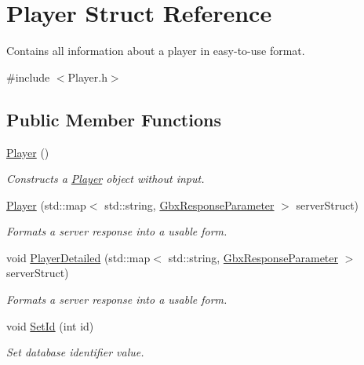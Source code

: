 \hypertarget{structPlayer}{\section{Player Struct Reference}
\label{structPlayer}
}


Contains all information about a player in easy-\/to-\/use format.  




{\ttfamily \#include $<$Player.\-h$>$}

\subsection*{Public Member Functions}
\begin{DoxyCompactItemize}
\item 
\hypertarget{structPlayer_affe0cc3cb714f6deb4e62f0c0d3f1fd8}{\hyperlink{structPlayer_affe0cc3cb714f6deb4e62f0c0d3f1fd8}{Player} ()}\label{structPlayer_affe0cc3cb714f6deb4e62f0c0d3f1fd8}

\begin{DoxyCompactList}\small\item\em Constructs a \hyperlink{structPlayer}{Player} object without input. \end{DoxyCompactList}\item 
\hyperlink{structPlayer_adf15eb006b535a4e1b72b419021f1f11}{Player} (std\-::map$<$ std\-::string, \hyperlink{classGbxResponseParameter}{Gbx\-Response\-Parameter} $>$ server\-Struct)
\begin{DoxyCompactList}\small\item\em Formats a server response into a usable form. \end{DoxyCompactList}\item 
void \hyperlink{structPlayer_a4e7c4a5bfc6fe42e23069a79f495b461}{Player\-Detailed} (std\-::map$<$ std\-::string, \hyperlink{classGbxResponseParameter}{Gbx\-Response\-Parameter} $>$ server\-Struct)
\begin{DoxyCompactList}\small\item\em Formats a server response into a usable form. \end{DoxyCompactList}\item 
void \hyperlink{structPlayer_a8541713f4fceaf4d03745e9407c3c303}{Set\-Id} (int id)
\begin{DoxyCompactList}\small\item\em Set database identifier value. \end{DoxyCompactList}\end{DoxyCompactItemize}
